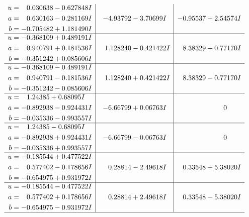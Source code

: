 \documentclass[1p]{elsarticle_modified}
\theoremstyle{definition}
\begin{document}
$$\begin{array}{c|c|c}
\begin{aligned}
u &= \phantom{-}0.030638 - 0.627848 I \\
a &= \phantom{-}0.630163 - 0.281169 I \\
b &= -0.705482 + 1.181490 I\end{aligned}
 & -4.93792 - 3.70699 I & -0.95537 + 2.54574 I \\ \hline\begin{aligned}
u &= -0.368109 + 0.489191 I \\
a &= \phantom{-}0.940791 + 0.181536 I \\
b &= -0.351242 + 0.085606 I\end{aligned}
 & \phantom{-}1.128240 - 0.421422 I & \phantom{-}8.38329 + 0.77170 I \\ \hline\begin{aligned}
u &= -0.368109 - 0.489191 I \\
a &= \phantom{-}0.940791 - 0.181536 I \\
b &= -0.351242 - 0.085606 I\end{aligned}
 & \phantom{-}1.128240 + 0.421422 I & \phantom{-}8.38329 - 0.77170 I \\ \hline\begin{aligned}
u &= \phantom{-}1.24385 + 0.68095 I \\
a &= -0.892938 - 0.924431 I \\
b &= -0.035336 - 0.993557 I\end{aligned}
 & -6.66799 + 0.06763 I & \phantom{-0.000000 } 0 \\ \hline\begin{aligned}
u &= \phantom{-}1.24385 - 0.68095 I \\
a &= -0.892938 + 0.924431 I \\
b &= -0.035336 + 0.993557 I\end{aligned}
 & -6.66799 - 0.06763 I & \phantom{-0.000000 } 0 \\ \hline\begin{aligned}
u &= -0.185544 + 0.477522 I \\
a &= \phantom{-}0.577402 - 0.178656 I \\
b &= -0.654975 + 0.931972 I\end{aligned}
 & \phantom{-}0.28814 - 2.49618 I & \phantom{-}0.33548 + 5.38020 I \\ \hline\begin{aligned}
u &= -0.185544 - 0.477522 I \\
a &= \phantom{-}0.577402 + 0.178656 I \\
b &= -0.654975 - 0.931972 I\end{aligned}
 & \phantom{-}0.28814 + 2.49618 I & \phantom{-}0.33548 - 5.38020 I\\
 \hline 
 \end{array}$$\newpage\newpage\renewcommand{\arraystretch}{1}
\end{document}
